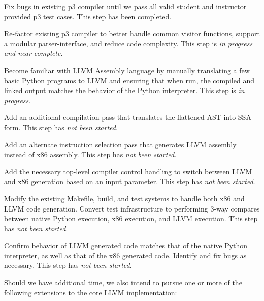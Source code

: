 \documentclass[11pt]{article}
\newenvironment{packed_enum}{
\begin{enumerate}
  \setlength{\itemsep}{1pt}
  \setlength{\parskip}{0pt}
  \setlength{\parsep}{0pt}
}{\end{enumerate}}
\begin{document}
\begin{packed_enum}
\item Fix bugs in existing p3 compiler until we pass all valid student
  and instructor provided p3 test cases. This step has been completed.
\item Re-factor existing p3 compiler to better handle common visitor
  functions, support a modular parser-interface, and reduce code
  complexity. This step is \emph{in progress and near complete}.
\item Become familiar with LLVM Assembly language by manually
  translating a few basic Python programs to LLVM and ensuring that
  when run, the compiled and linked output matches the behavior of the
  Python interpreter. This step is \emph{in progress}.
\item Add an additional compilation pass that translates the flattened
  AST into SSA form. This step has \emph{not been started}.
\item Add an alternate instruction selection pass that generates LLVM
  assembly instead of x86 assembly. This step has \emph{not been
    started}.
\item Add the necessary top-level compiler control handling to switch
  between LLVM and x86 generation based on an input parameter. This
  step has \emph{not been started}.
\item Modify the existing Makefile, build, and test systems to handle
  both x86 and LLVM code generation. Convert test infrastructure to
  performing 3-way compares between native Python execution, x86
  execution, and LLVM execution. This step has \emph{not been
    started}.
\item Confirm behavior of LLVM generated code matches that of the
  native Python interpreter, as well as that of the x86 generated
  code. Identify and fix bugs as necessary. This step has \emph{not
    been started}.
\end{packed_enum}

Should we have additional time, we also intend to pursue one or more
of the following extensions to the core LLVM implementation:
\end{document}
